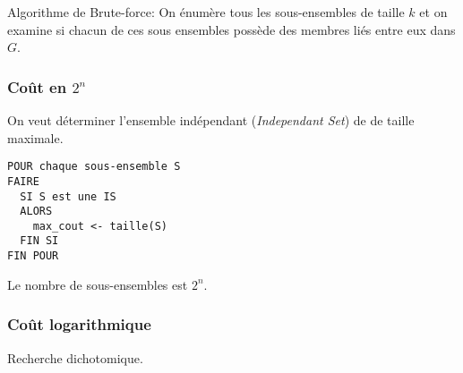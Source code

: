 Algorithme de Brute-force:
On énumère tous les sous-ensembles de taille $k$ et on examine si chacun de
ces sous ensembles possède des membres liés entre eux dans $G$.

\subsubsection{Coût en $2^n$}
On veut déterminer l'ensemble indépendant (\textit{Independant Set}) de
de taille maximale.
\begin{verbatim}
POUR chaque sous-ensemble S
FAIRE
  SI S est une IS
  ALORS
    max_cout <- taille(S)
  FIN SI
FIN POUR
\end{verbatim}
Le nombre de sous-ensembles est $2^n$.

\subsubsection{Coût logarithmique}
Recherche dichotomique.
